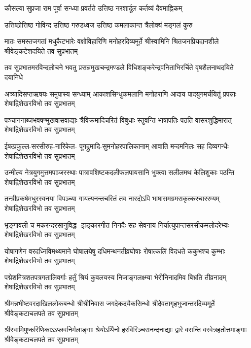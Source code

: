
\twolineshloka
{कौसल्या सुप्रजा राम पूर्वा सन्ध्या प्रवर्तते}
{उत्तिष्ठ नरशार्दूल कर्तव्यं दैवमाह्निकम्}

\twolineshloka
{उत्तिष्ठोत्तिष्ठ गोविन्द उत्तिष्ठ गरुडध्वज}
{उत्तिष्ठ कमलाकान्त त्रैलोक्यं मङ्गलं कुरु}

\fourlineindentedshloka
{मातः समस्तजगतां मधुकैटभारेः}
{वक्षोविहारिणि मनोहरदिव्यमूर्ते}
{श्रीस्वामिनि श्रितजनप्रियदानशीले}
{श्रीवेङ्कटेशदयिते तव सुप्रभातम्}

\fourlineindentedshloka
{तव सुप्रभातमरविन्दलोचने}
{भवतु प्रसन्नमुखचन्द्रमण्डले}
{विधिशङ्करेन्द्रवनिताभिरर्चिते}
{वृषशैलनाथदयिते दयानिधे}

\fourlineindentedshloka
{अत्र्यादिसप्तऋषयः समुपास्य सन्ध्याम्}
{आकाशसिन्धुकमलानि मनोहराणि}
{आदाय पादयुगमर्चयितुं प्रपन्नाः}
{शेषाद्रिशेखरविभो तव सुप्रभातम्}

\fourlineindentedshloka
{पञ्चाननाब्जभवषण्मुखवासवाद्याः}
{त्रैविक्रमादिचरितं विबुधाः स्तुवन्ति}
{भाषापतिः पठति वासरशुद्धिमारात्}
{शेषाद्रिशेखरविभो तव सुप्रभातम्}

\fourlineindentedshloka
{ईषत्प्रफुल्ल-सरसीरुह-नारिकेल-}
{पूगद्रुमादि-सुमनोहरपालिकानाम्}
{आवाति मन्दमनिलः सह दिव्यगन्धैः}
{शेषाद्रिशेखरविभो तव सुप्रभातम्}

\fourlineindentedshloka
{उन्मील्य नेत्रयुगमुत्तमपञ्जरस्थाः}
{पात्रावशिष्टकदलीफलपायसानि}
{भुक्त्वा सलीलमथ केलिशुकाः पठन्ति}
{शेषाद्रिशेखरविभो तव सुप्रभातम्}

\fourlineindentedshloka
{तन्त्रीप्रकर्षमधुरस्वनया विपञ्च्या}
{गायत्यनन्तचरितं तव नारदोऽपि}
{भाषासमग्रमसकृत्करचाररम्यम्}
{शेषाद्रिशेखरविभो तव सुप्रभातम्}

\fourlineindentedshloka
{भृङ्गावली च मकरन्दरसानुविद्ध-}
{झङ्कारगीत निनदैः सह सेवनाय}
{निर्यात्युपान्तसरसीकमलोदरेभ्यः}
{शेषाद्रिशेखरविभो तव सुप्रभातम्}

\fourlineindentedshloka
{योषागणेन वरदध्निविमथ्यमाने}
{घोषालयेषु दधिमन्थनतीव्रघोषाः}
{रोषात्कलिं विदधते ककुभश्च कुम्भाः}
{शेषाद्रिशेखरविभो तव सुप्रभातम्}

\fourlineindentedshloka
{पद्मेशमित्रशतपत्रगतालिवर्गाः}
{हर्तुं श्रियं कुवलयस्य निजाङ्गलक्ष्म्या}
{भेरीनिनादमिव बिभ्रति तीव्रनादम्}
{शेषाद्रिशेखरविभो तव सुप्रभातम्}

\fourlineindentedshloka
{श्रीमन्नभीष्टवरदाखिललोकबन्धो}
{श्रीश्रीनिवास जगदेकदयैकसिन्धो}
{श्रीदेवतागृहभुजान्तरदिव्यमूर्ते}
{श्रीवेङ्कटाचलपते तव सुप्रभातम्}

\fourlineindentedshloka
{श्रीस्वामिपुष्करिणिकाऽऽप्लवनिर्मलाङ्गाः}
{श्रेयोऽर्थिनो हरविरिञ्चसनन्दनाद्याः}
{द्वारे वसन्ति वरवेत्रहतोत्तमाङ्गाः}
{श्रीवेङ्कटाचलपते तव सुप्रभातम्}

